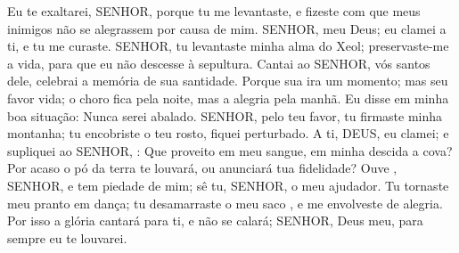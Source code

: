 
{\PP 
  Eu te exaltarei, SENHOR, porque tu me levantaste, e fizeste com que meus inimigos não se alegrassem por causa de mim.
  SENHOR, meu Deus; eu clamei a ti, e tu me curaste.
  SENHOR, tu levantaste minha alma do Xeol;
 preservaste-me a vida, para que eu não descesse à sepultura.
  Cantai ao SENHOR, vós
{} santos dele,
{} celebrai a memória de sua santidade.
  Porque sua ira
{} um momento; mas seu favor
{} vida; o choro fica pela noite, mas a alegria
{} pela manhã.
  Eu disse em minha boa situação: Nunca serei abalado.
  SENHOR, pelo teu favor, tu firmaste minha montanha;
{} tu encobriste o teu rosto, fiquei perturbado.
  A ti, DEUS, eu clamei; e supliquei ao SENHOR,
   : Que proveito
{} em meu sangue,
{} em minha descida a cova? Por acaso o pó da terra te louvará, ou anunciará tua fidelidade?
  Ouve
{},  SENHOR, e tem piedade de mim; sê tu, SENHOR, o meu ajudador.
  Tu tornaste meu pranto em dança; tu desamarraste o meu saco
{},  e me envolveste de alegria.
  Por isso a
{} glória cantará para ti, e não se calará; SENHOR, Deus meu, para sempre eu te louvarei.
\par }


